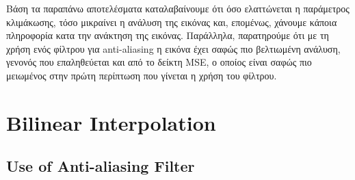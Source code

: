 \documentclass{article}
\begin{document}
	\noindent
	Βάση τα παραπάνω αποτελέσματα καταλαβαίνουμε ότι όσο ελαττώνεται η παράμετρος κλιμάκωσης, τόσο μικραίνει η ανάλυση της εικόνας και, επομένως, χάνουμε κάποια πληροφορία κατα την ανάκτηση της εικόνας. Παράλληλα, παρατηρούμε ότι με τη χρήση ενός φίλτρου για anti-aliasing η εικόνα έχει σαφώς πιο βελτιωμένη ανάλυση, γενονός που επαληθεύεται και από το δείκτη MSE, ο οποίος είναι σαφώς πιο μειωμένος στην πρώτη περίπτωση που γίνεται η χρήση του φίλτρου.

\pagebreak

\section*{Bilinear Interpolation}
\subsection*{Use of Anti-aliasing Filter}
\end{document}
